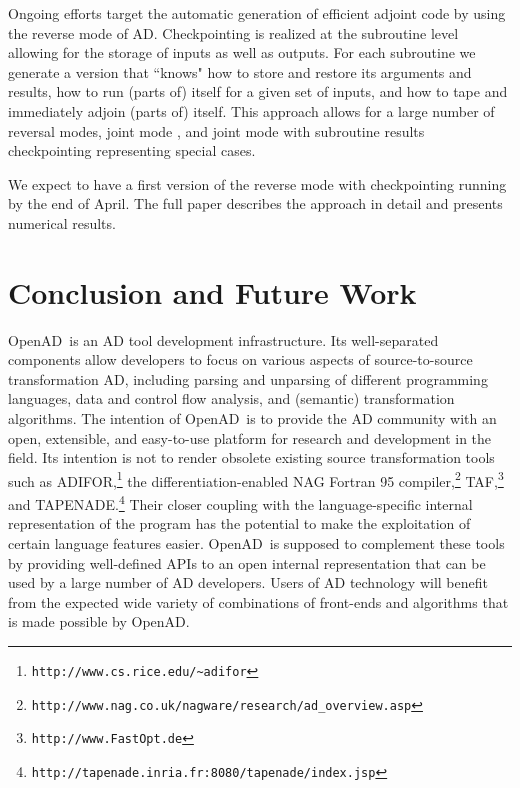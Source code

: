 \documentclass[acmtocl,acmnow]{acmtrans2m}
\newcommand{\OpenAD}{OpenAD}
\begin{document}
Ongoing efforts target the automatic generation of efficient adjoint
code by using the reverse mode of AD. Checkpointing is realized at the 
subroutine level allowing for the storage of inputs as well as outputs. 
For each subroutine we generate a version that ``knows" how to store and 
restore its arguments and results, how to run (parts of) itself for a given
set of inputs, and how to tape and immediately adjoin (parts of) itself.
This approach allows for a large number of reversal modes, 
joint mode \cite{Gri00}, and joint mode with subroutine results checkpointing 
representing special cases. 

We expect to have a first version of the reverse mode with checkpointing
running by the end of April. The full paper describes the approach in detail 
and presents numerical results.

\section*{Conclusion and Future Work}

\OpenAD\ is an AD tool development infrastructure. Its well-separated components
allow developers to focus on various aspects of source-to-source 
transformation AD, including parsing and unparsing of different programming
languages, data and control flow analysis, and (semantic) transformation 
algorithms. The intention of \OpenAD\ is to provide the AD community with 
an open, extensible, and easy-to-use platform for research and development
in the field. Its intention is not to render obsolete existing source transformation
tools such as ADIFOR,\footnote{{\tt http://www.cs.rice.edu/\~\!adifor}} 
the differentiation-enabled NAG Fortran 95 
compiler,\footnote{{\tt http://www.nag.co.uk/nagware/research/ad\_overview.asp}} TAF,\footnote{{\tt http://www.FastOpt.de}} and TAPENADE.\footnote{{\tt http://tapenade.inria.fr:8080/tapenade/index.jsp}} 
Their closer coupling with the language-specific internal representation of 
the program has the potential to make the
exploitation of certain language features easier. \OpenAD\ is supposed to 
complement these tools by providing well-defined APIs to an open internal 
representation that can be used by a large number of AD developers.
Users of AD technology will benefit from the expected wide
variety of combinations of front-ends and algorithms that is made possible
by \OpenAD.
\end{document}
